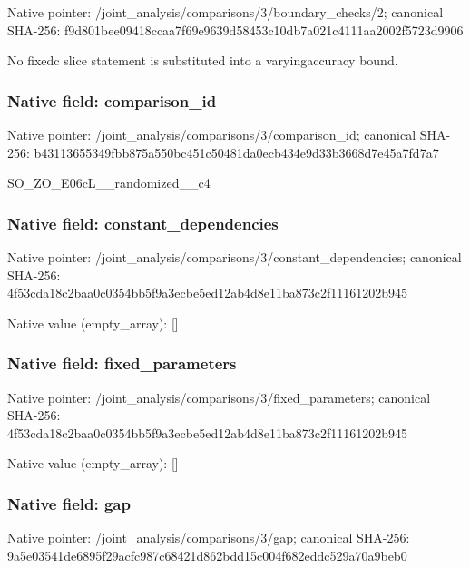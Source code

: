 \documentclass[10pt,a4paper]{article}
\begin{document}
Native pointer: /joint\_analysis/comparis\allowbreak{}ons/3/boundary\_checks/2; canonical SHA-256: f9d801bee09418ccaa7f69e9\allowbreak{}639d58453c10db7a021c4111\allowbreak{}aa2002f5723d9906


No fixedc slice statement is substituted into a varyingaccuracy bound.


\subsubsection{Native field: comparison\_id}


Native pointer: /joint\_analysis/comparis\allowbreak{}ons/3/comparison\_id; canonical SHA-256: b43113655349fbb875a550bc\allowbreak{}451c50481da0ecb434e9d33b\allowbreak{}3668d7e45a7fd7a7


SO\_ZO\_E06cL\_\_randomized\_\_c4


\subsubsection{Native field: constant\_dependencies}


Native pointer: /joint\_analysis/comparis\allowbreak{}ons/3/constant\_dependenc\allowbreak{}ies; canonical SHA-256: 4f53cda18c2baa0c0354bb5f\allowbreak{}9a3ecbe5ed12ab4d8e11ba87\allowbreak{}3c2f11161202b945



Native value (empty\_array): []



\subsubsection{Native field: fixed\_parameters}


Native pointer: /joint\_analysis/comparis\allowbreak{}ons/3/fixed\_parameters; canonical SHA-256: 4f53cda18c2baa0c0354bb5f\allowbreak{}9a3ecbe5ed12ab4d8e11ba87\allowbreak{}3c2f11161202b945



Native value (empty\_array): []



\subsubsection{Native field: gap}


Native pointer: /joint\_analysis/comparisons/3/gap; canonical SHA-256: 9a5e03541de6895f29acfc98\allowbreak{}7c68421d862bdd15c004f682\allowbreak{}eddc529a70a9beb0
\end{document}
